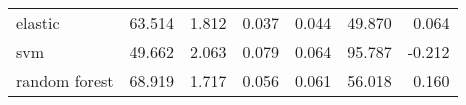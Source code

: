 \begin{tabular}{lrrrrrr}
\toprule
elastic       & 63.514 & 1.812 & 0.037 & 0.044 & 49.870 &  0.064 \\
svm           & 49.662 & 2.063 & 0.079 & 0.064 & 95.787 & -0.212 \\
random forest & 68.919 & 1.717 & 0.056 & 0.061 & 56.018 &  0.160 \\
\bottomrule
\end{tabular}
